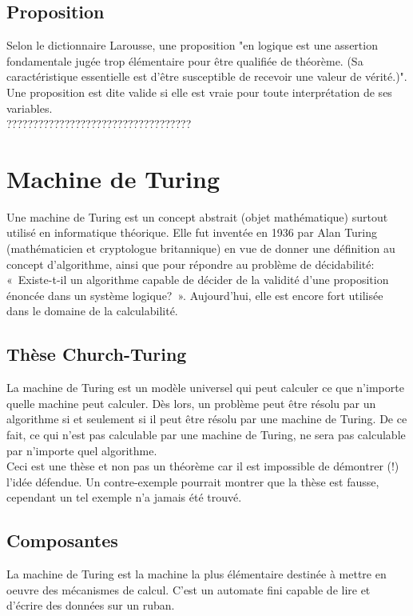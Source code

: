 \documentclass[a4paper, 10pt, titlepage]{report}
\begin{document}
\section*{Proposition}

Selon le dictionnaire Larousse, une proposition "en logique est une assertion fondamentale jugée trop élémentaire pour être qualifiée de théorème. (Sa caractéristique essentielle est d'être susceptible
de recevoir une valeur de vérité.)". \\
Une proposition est dite valide si elle est vraie pour toute interprétation de ses variables. \\
???????????????????????????????????

\chapter{Machine de Turing}

Une machine de Turing est un concept abstrait (objet mathématique) surtout utilisé en informatique théorique. Elle fut inventée en 1936 par Alan Turing (mathématicien et cryptologue britannique) en vue de donner une définition au concept d’algorithme, ainsi que pour répondre au problème de décidabilité: « Existe-t-il un algorithme capable de décider de la validité d’une proposition énoncée dans un système logique? ». Aujourd’hui, elle est encore fort utilisée dans le domaine de la calculabilité.

\section*{Thèse Church-Turing}

La machine de Turing est un modèle universel qui peut calculer ce que n’importe quelle machine peut calculer. Dès lors, un problème peut être résolu par un algorithme si et seulement si il peut être résolu par une machine de Turing. De ce fait, ce qui n’est pas calculable par une machine de Turing, ne sera pas calculable par n’importe quel algorithme. \\
Ceci est une thèse et non pas un théorème car il est impossible de démontrer (!) l'idée défendue. Un contre-exemple pourrait montrer que la thèse est fausse, cependant un tel exemple n'a jamais été trouvé.

\section{Composantes}

La machine de Turing est la machine la plus élémentaire destinée à mettre en oeuvre des mécanismes de calcul. C'est un automate fini capable de lire et d'écrire des données sur un ruban.
\end{document}
